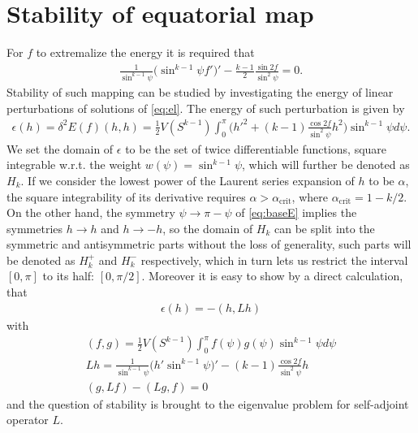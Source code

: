 \section*{Stability of equatorial map}

For $f$ to extremalize the energy it is required that
\begin{gather}\label{eq:el}
  \frac{1}{\sin^{k-1}\psi}\big(\sin^{k-1}\psi f'\big)'-\frac{k-1}{2}\frac{\sin 2 f}{\sin^2\psi}=0.
\end{gather}
Stability of such mapping can be studied by investigating the energy
of linear perturbations of solutions of \eqref{eq:el}. The energy of
such perturbation is given by
\begin{gather}\label{eq:infE}
  \epsilon(h)=\delta^2E(f)(h,h)=\frac{1}{2}V(S^{k-1})\int_0^{\pi}\bigg(h'^2+(k-1)\frac{\cos 2f}{\sin^2\psi }h^2\bigg)\sin^{k-1}\psi d\psi.
\end{gather}
We set the domain of $\epsilon$ to be the set of twice differentiable
functions, square integrable w.r.t. the weight
$w(\psi)=\sin^{k-1}\psi$, which will further be denoted as $H_k$. If
we consider the lowest power of the Laurent series expansion of $h$ to
be $\alpha$, the square integrability of its derivative requires
$\alpha>\alpha_{\text{crit}}$, where $\alpha_{\text{crit}}=1-k/2$. On
the other hand, the symmetry $\psi\rightarrow\pi-\psi$ of
\eqref{eq:baseE} implies the symmetries $h\rightarrow h$ and
$h\rightarrow-h$, so the domain of $H_k$ can be split into the
symmetric and antisymmetric parts without the loss of generality, such
parts will be denoted as $H^+_k$ and $H^-_k$ respectively, which in
turn lets us restrict the interval $[0,\pi]$ to its half:
$[0,\pi/2]$. Moreover it is easy to show by a direct calculation, that
\begin{gather}
  \epsilon(h)=-(h,Lh)
\end{gather}
with
\begin{gather}
  (f,g)=\frac{1}{2}V(S^{k-1})\int_0^\pi f(\psi) g(\psi) \sin^{k-1}\psi d\psi\\
  Lh=\frac{1}{\sin^{k-1}\psi}\big(h'\sin^{k-1}\psi\big)'-(k-1)\frac{\cos 2 f}{\sin^2\psi}h\\
  (g,Lf)-(Lg,f)=0
\end{gather}
and the question of stability is brought to the eigenvalue problem for
self-adjoint operator $L$.\\

